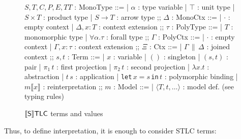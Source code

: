 \begin{figure}
\centering
\begin{bnf}
    $S,T,C,P,E,TT$ : \textsf{MonoType} ::=
    | $\alpha$ : type variable
    | $\top$ : unit type
    | $S\times T$ : product type
    | $S\to T$ : arrow type
    ;;
    $\Delta$ : \textsf{MonoCtx} ::=
    | $\cdot$ : empty context
    | $\Delta,x\colon T$ : context extension
    ;;
    $\tau$ : \textsf{PolyType} ::=
    | $T$ : monomorphic type
    | $\forall\alpha.\tau$ : forall type
    ;;
    $\Gamma$ : \textsf{PolyCtx} ::=
    | $\cdot$ : empty context
    | $\Gamma,x\colon\tau$ : context extension
    ;;
    $\Xi$ : \textsf{Ctx} ::=
    | $\Gamma\,\|\,\Delta$ : joined context
    ;;
    $s,t$ : \textsf{Term} ::=
    | $x$ : variable
    | $()$ : singleton
    | $(s, t)$ : pair
    | $\pi_1\,t$ : first projection
    | $\pi_2\,t$ : second projection
    | $\lambda x. t$ : abstraction
    | $t\,s$ : application
    | \texttt{let}\,$x=s$\,\texttt{in}\,$t$
        : polymorphic binding
    | $m\llbracket x\rrbracket$ : reinterpretation
    ;;
    $m$ : \textsf{Model} ::=
    | $\langle T, t, \ldots \rangle$
        : model def. (see typing rules)
\end{bnf}
\caption{$\llbracket\mathsf{S}\rrbracket\mathsf{TLC}$ terms and values}
\label{sstlc-grammar}
\end{figure}

\newpage
Thus, to define interpretation, it is enough to consider
STLC terms:

